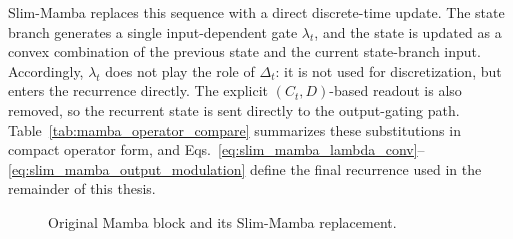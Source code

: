 \documentclass[11pt,twoside]{eitExjobb}
\begin{document}
Slim-Mamba replaces this sequence with a direct discrete-time update. The state branch
generates a single input-dependent gate \(\lambda_t\), and the state is updated as a
convex combination of the previous state and the current state-branch input.
Accordingly, \(\lambda_t\) does not play the role of \(\Delta_t\): it is not used for
discretization, but enters the recurrence directly. The explicit \((C_t,D)\)-based
readout is also removed, so the recurrent state is sent directly to the output-gating
path. Table~\ref{tab:mamba_operator_compare} summarizes these substitutions in compact
operator form, and Eqs.~\eqref{eq:slim_mamba_lambda_conv}--
\eqref{eq:slim_mamba_output_modulation} define the final recurrence used in the
remainder of this thesis.

\begin{figure}[H]
  \centering
  
  \caption{Original Mamba block and its Slim-Mamba replacement.}
  \label{fig:mamba_v1_slim_replacement}
\end{figure}
\end{document}
